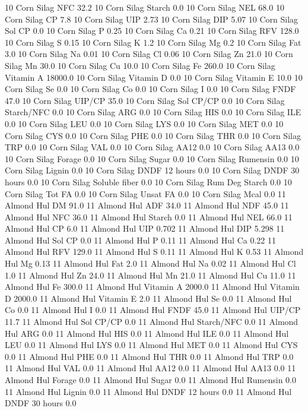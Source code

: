 \documentclass[letterpaper,10pt,english]{sphinxmanual}
\begin{document}
\begin{sphinxVerbatim}[commandchars=\\\{\},numbers=left,firstnumber=1,stepnumber=1]
10 Corn Silag NFC 32.2
10 Corn Silag Starch 0.0
10 Corn Silag NEL 68.0
10 Corn Silag CP 7.8
10 Corn Silag UIP 2.73
10 Corn Silag DIP 5.07
10 Corn Silag Sol CP 0.0
10 Corn Silag P 0.25
10 Corn Silag Ca 0.21
10 Corn Silag RFV 128.0
10 Corn Silag S 0.15
10 Corn Silag K 1.2
10 Corn Silag Mg 0.2
10 Corn Silag Fat 3.0
10 Corn Silag Na 0.01
10 Corn Silag Cl 0.06
10 Corn Silag Zn 21.0
10 Corn Silag Mn 30.0
10 Corn Silag Cu 10.0
10 Corn Silag Fe 260.0
10 Corn Silag Vitamin A 18000.0
10 Corn Silag Vitamin D 0.0
10 Corn Silag Vitamin E 10.0
10 Corn Silag Se 0.0
10 Corn Silag Co 0.0
10 Corn Silag I 0.0
10 Corn Silag FNDF 47.0
10 Corn Silag UIP/CP 35.0
10 Corn Silag Sol CP/CP 0.0
10 Corn Silag Starch/NFC 0.0
10 Corn Silag ARG 0.0
10 Corn Silag HIS 0.0
10 Corn Silag ILE 0.0
10 Corn Silag LEU 0.0
10 Corn Silag LYS 0.0
10 Corn Silag MET 0.0
10 Corn Silag CYS 0.0
10 Corn Silag PHE 0.0
10 Corn Silag THR 0.0
10 Corn Silag TRP 0.0
10 Corn Silag VAL 0.0
10 Corn Silag AA\PYGZsh{}12 0.0
10 Corn Silag AA\PYGZsh{}13 0.0
10 Corn Silag \PYGZpc{} Forage 0.0
10 Corn Silag Sugar \PYGZpc{} 0.0
10 Corn Silag Rumensin 0.0
10 Corn Silag Lignin 0.0
10 Corn Silag DNDF 12 hours 0.0
10 Corn Silag DNDF 30 hours 0.0
10 Corn Silag Soluble fiber 0.0
10 Corn Silag Rum Deg Starch 0.0
10 Corn Silag Tot FA 0.0
10 Corn Silag Unsat FA 0.0
10 Corn Silag Mcal 0.0
11 Almond Hul DM 91.0
11 Almond Hul ADF 34.0
11 Almond Hul NDF 45.0
11 Almond Hul NFC 36.0
11 Almond Hul Starch 0.0
11 Almond Hul NEL 66.0
11 Almond Hul CP 6.0
11 Almond Hul UIP 0.702
11 Almond Hul DIP 5.298
11 Almond Hul Sol CP 0.0
11 Almond Hul P 0.11
11 Almond Hul Ca 0.22
11 Almond Hul RFV 129.0
11 Almond Hul S 0.11
11 Almond Hul K 0.53
11 Almond Hul Mg 0.13
11 Almond Hul Fat 2.0
11 Almond Hul Na 0.02
11 Almond Hul Cl 1.0
11 Almond Hul Zn 24.0
11 Almond Hul Mn 21.0
11 Almond Hul Cu 11.0
11 Almond Hul Fe 300.0
11 Almond Hul Vitamin A 2000.0
11 Almond Hul Vitamin D 2000.0
11 Almond Hul Vitamin E 2.0
11 Almond Hul Se 0.0
11 Almond Hul Co 0.0
11 Almond Hul I 0.0
11 Almond Hul FNDF 45.0
11 Almond Hul UIP/CP 11.7
11 Almond Hul Sol CP/CP 0.0
11 Almond Hul Starch/NFC 0.0
11 Almond Hul ARG 0.0
11 Almond Hul HIS 0.0
11 Almond Hul ILE 0.0
11 Almond Hul LEU 0.0
11 Almond Hul LYS 0.0
11 Almond Hul MET 0.0
11 Almond Hul CYS 0.0
11 Almond Hul PHE 0.0
11 Almond Hul THR 0.0
11 Almond Hul TRP 0.0
11 Almond Hul VAL 0.0
11 Almond Hul AA\PYGZsh{}12 0.0
11 Almond Hul AA\PYGZsh{}13 0.0
11 Almond Hul \PYGZpc{} Forage 0.0
11 Almond Hul Sugar \PYGZpc{} 0.0
11 Almond Hul Rumensin 0.0
11 Almond Hul Lignin 0.0
11 Almond Hul DNDF 12 hours 0.0
11 Almond Hul DNDF 30 hours 0.0

\end{sphinxVerbatim}
\end{document}

